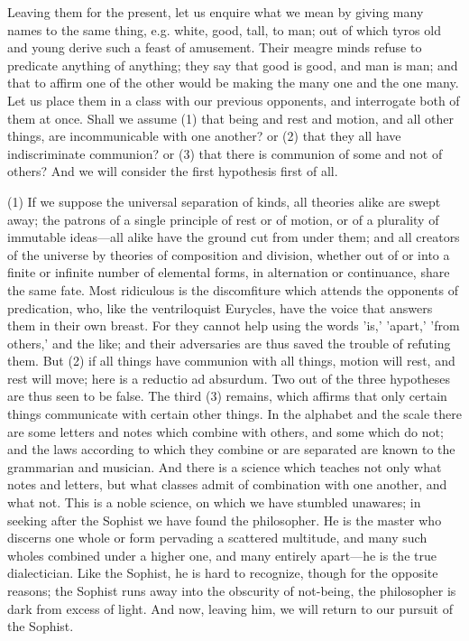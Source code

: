 \documentclass[11pt,letter]{article}
\begin{document}
\par  Leaving them for the present, let us enquire what we mean by giving many names to the same thing, e.g. white, good, tall, to man; out of which tyros old and young derive such a feast of amusement. Their meagre minds refuse to predicate anything of anything; they say that good is good, and man is man; and that to affirm one of the other would be making the many one and the one many. Let us place them in a class with our previous opponents, and interrogate both of them at once. Shall we assume (1) that being and rest and motion, and all other things, are incommunicable with one another? or (2) that they all have indiscriminate communion? or (3) that there is communion of some and not of others? And we will consider the first hypothesis first of all.

\par  (1) If we suppose the universal separation of kinds, all theories alike are swept away; the patrons of a single principle of rest or of motion, or of a plurality of immutable ideas—all alike have the ground cut from under them; and all creators of the universe by theories of composition and division, whether out of or into a finite or infinite number of elemental forms, in alternation or continuance, share the same fate. Most ridiculous is the discomfiture which attends the opponents of predication, who, like the ventriloquist Eurycles, have the voice that answers them in their own breast. For they cannot help using the words 'is,' 'apart,' 'from others,' and the like; and their adversaries are thus saved the trouble of refuting them. But (2) if all things have communion with all things, motion will rest, and rest will move; here is a reductio ad absurdum. Two out of the three hypotheses are thus seen to be false. The third (3) remains, which affirms that only certain things communicate with certain other things. In the alphabet and the scale there are some letters and notes which combine with others, and some which do not; and the laws according to which they combine or are separated are known to the grammarian and musician. And there is a science which teaches not only what notes and letters, but what classes admit of combination with one another, and what not. This is a noble science, on which we have stumbled unawares; in seeking after the Sophist we have found the philosopher. He is the master who discerns one whole or form pervading a scattered multitude, and many such wholes combined under a higher one, and many entirely apart—he is the true dialectician. Like the Sophist, he is hard to recognize, though for the opposite reasons; the Sophist runs away into the obscurity of not-being, the philosopher is dark from excess of light. And now, leaving him, we will return to our pursuit of the Sophist.
\end{document}

